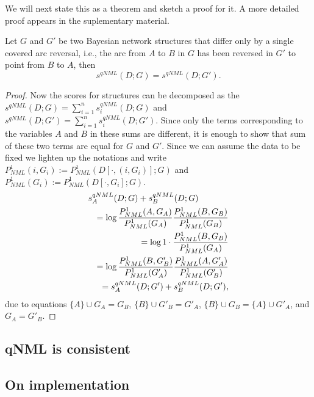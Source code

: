 We will next state this as a
theorem and sketch a proof for it. A more detailed proof appears in the
suplementary material.
\begin{theorem}
  \label{thm:scoreqv}
  Let $G$ and $G'$ be two Bayesian network structures that differ only
  by a single covered arc reversal, i.e., the arc from $A$ to $B$ in $G$
  has been reversed in $G'$ to point from $B$ to $A$, then
  $$s^{qNML}(D;G)=s^{qNML}(D;G').$$
\end{theorem}
\begin{proof}
  Now the scores for structures can be decomposed as the
  $s^{qNML}(D;G)=\sum_{i=1}^{n}s_i^{qNML}(D;G)$ and
  $s^{qNML}(D;G')=\sum_{i=1}^{n}s_i^{qNML}(D;G')$.  Since only the
  terms corresponding to the variables $A$ and $B$ in these sums are
  different, it is enough to show that sum of these two terms are
  equal for $G$ and $G'$. Since we can assume the data to be fixed we
  lighten up the notations and write
  $P^1_{NML}(i,G_i) := P^1_{NML}(D[\cdot,(i,G_i)];G)$ and
  $P^1_{NML}(G_i)   := P^1_{NML}(D[\cdot,G_i];G)$.
  \begin{eqnarray}
    \lefteqn{s_A^{qNML}(D;G)+s_B^{qNML}(D;G)} \nonumber\\
    && =\log\frac{P^1_{NML}(A,G_{A})}{P^1_{NML}(G_{A})}
            \frac{P^1_{NML}(B,G_{B})}{P^1_{NML}(G_{B})}\nonumber\\
    && =\log 1\cdot\frac{P^1_{NML}(B,G_{B})}{P^1_{NML}(G_{A})}\nonumber\\
    && =\log \frac{P^1_{NML}(B,G'_{B})}{P^1_{NML}(G'_{A})}
             \frac{P^1_{NML}(A,G'_{A})}{P^1_{NML}(G'_{B})}\nonumber\\
 && =s_A^{qNML}(D;G')+s_B^{qNML}(D;G'),\nonumber
\end{eqnarray}
  due to equations
  $\{A\}\cup G_A  = G_B$,
  $\{B\}\cup G'_B = G'_A$,
  $\{B\}\cup G_B  = \{A\} \cup G'_A$,
  and $G_A        = G'_B$.
\end{proof}

\subsection{qNML is consistent}


\subsection {On implementation}

